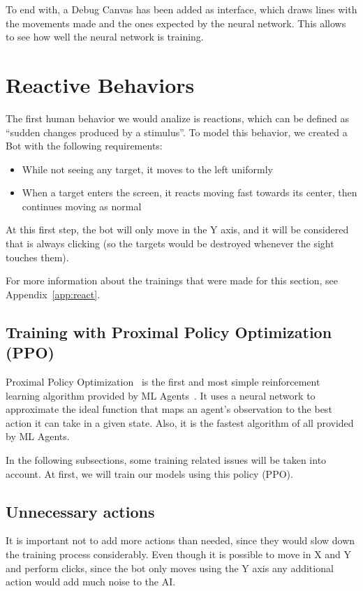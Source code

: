To end with, a Debug Canvas has been added as interface, which draws lines with the movements made and the ones expected by the neural network. This allows to see how well the neural network is training.

\section{Reactive Behaviors}

The first human behavior we would analize is reactions, which can be defined as ``sudden changes produced by a stimulus''. To model this behavior, we created a Bot with the following requirements:

\begin{itemize}
 \item While not seeing any target, it moves to the left uniformly
 \item When a target enters the screen, it reacts moving fast towards its center, then continues moving as normal
\end{itemize}

At this first step, the bot will only move in the Y axis, and it will be considered that is always clicking (so the targets would be destroyed whenever the sight touches them).

For more information about the trainings that were made for this section, see Appendix~\ref{app:react}.

\subsection{Training with Proximal Policy Optimization (PPO)}
\label{sec:trainingPPO}

Proximal Policy Optimization~\cite{ppopolicy} is the first and most simple reinforcement learning algorithm  provided by ML Agents~\cite{mlagents}. It uses a neural network to approximate the ideal function that maps an agent's observation to the best action it can take in a given state. Also, it is the fastest algorithm of all provided by ML Agents.

In the following subsections, some training related issues will be taken into account. At first, we will train our models using this policy (PPO).

\subsection{Unnecessary actions}
It is important not to add more actions than needed, since they would slow down the training process considerably. Even though it is possible to move in X and Y and perform clicks, since the bot only moves using the Y axis any additional action would add much noise to the AI. 

